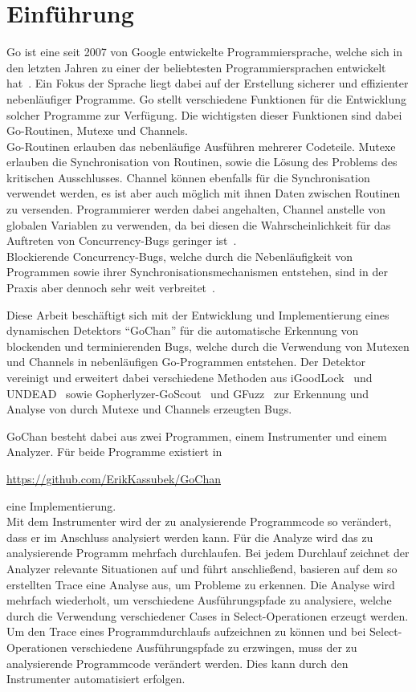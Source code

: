 \chapter{Einführung}\label{chap:introduction}
Go ist eine seit 2007 von Google entwickelte Programmiersprache, welche sich 
in den letzten Jahren zu einer der beliebtesten Programmiersprachen entwickelt 
hat~\cite{ranking}. Ein Fokus der Sprache liegt dabei auf der Erstellung
sicherer und effizienter nebenläufiger Programme. Go stellt verschiedene 
Funktionen für die Entwicklung solcher Programme zur Verfügung.
Die wichtigsten dieser Funktionen sind dabei Go-Routinen, Mutexe und 
Channels.\\Go-Routinen erlauben das nebenläufige Ausführen mehrerer Codeteile.
Mutexe erlauben die Synchronisation von Routinen, sowie die Lösung des Problems 
des kritischen Ausschlusses. 
Channel können ebenfalls für die Synchronisation verwendet werden,
es ist aber auch möglich mit ihnen Daten zwischen Routinen zu versenden. 
Programmierer werden dabei angehalten, Channel
anstelle von globalen Variablen zu verwenden, da bei diesen die Wahrscheinlichkeit
für das Auftreten von Concurrency-Bugs geringer ist~\cite{sharedMemory}.\\
Blockierende Concurrency-Bugs, welche durch die Nebenläufigkeit von Programmen sowie ihrer 
Synchronisationsmechanismen entstehen, sind in der Praxis aber dennoch sehr weit 
verbreitet~\cite{numberBugs}.

Diese Arbeit beschäftigt sich mit der Entwicklung und Implementierung
eines dynamischen Detektors ``GoChan'' für die automatische Erkennung
von blockenden und terminierenden Bugs, welche durch die Verwendung von Mutexen und Channels 
in nebenläufigen Go-Programmen entstehen. 
Der Detektor vereinigt und erweitert dabei verschiedene Methoden aus 
iGoodLock~\cite{iGoodLock} und UNDEAD~\cite{Undead} sowie 
Gopherlyzer-GoScout~\cite{PPDP18} und GFuzz~\cite{gfuzz} zur 
Erkennung und Analyse von 
durch Mutexe und Channels erzeugten Bugs.

GoChan besteht dabei aus zwei Programmen, einem Instrumenter und einem 
Analyzer. Für beide Programme existiert in 
\begin{center}
  \url{https://github.com/ErikKassubek/GoChan}
\end{center}
eine Implementierung.\\
Mit dem Instrumenter wird der zu analysierende Programmcode so verändert,
dass er im Anschluss analysiert werden kann.
Für die Analyze wird das zu analysierende Programm 
mehrfach durchlaufen. Bei jedem Durchlauf zeichnet der Analyzer relevante 
Situationen auf und führt anschließend, basieren auf dem so erstellten Trace 
eine Analyse aus, um Probleme zu erkennen. Die Analyse wird mehrfach wiederholt, 
um verschiedene Ausführungspfade zu analysiere, welche durch die Verwendung 
verschiedener Cases in Select-Operationen erzeugt werden. Um den Trace eines 
Programmdurchlaufs aufzeichnen zu können und bei Select-Operationen verschiedene 
Ausführungspfade zu erzwingen, muss der zu analysierende Programmcode 
verändert werden. Dies kann durch den Instrumenter automatisiert erfolgen.

